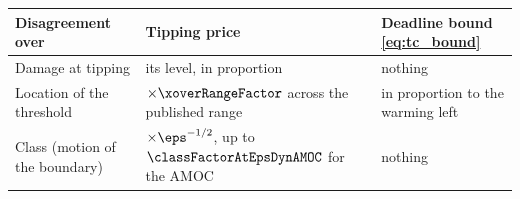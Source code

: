 \begin{tabular}{@{}lll@{}}
\toprule
Disagreement over & Tipping price & Deadline bound \eqref{eq:tc_bound} \\
\midrule
Damage at tipping & its level, in proportion & nothing \\
Location of the threshold & $\times\xoverRangeFactor$ across the published range & in proportion to the warming left \\
Class (motion of the boundary) & $\times\eps^{-1/2}$, up to $\classFactorAtEpsDynAMOC$ for the AMOC & nothing \\
\bottomrule
\end{tabular}
